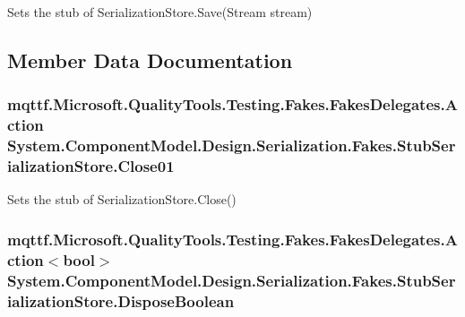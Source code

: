Sets the stub of Serialization\-Store.\-Save(\-Stream stream)



\subsection{Member Data Documentation}
\hypertarget{class_system_1_1_component_model_1_1_design_1_1_serialization_1_1_fakes_1_1_stub_serialization_store_adc5a8f6eb43aa016bbcc0d95c9507b6c}{
\subsubsection[{Close01}]{\setlength{\rightskip}{0pt plus 5cm}mqttf.\-Microsoft.\-Quality\-Tools.\-Testing.\-Fakes.\-Fakes\-Delegates.\-Action System.\-Component\-Model.\-Design.\-Serialization.\-Fakes.\-Stub\-Serialization\-Store.\-Close01}}\label{class_system_1_1_component_model_1_1_design_1_1_serialization_1_1_fakes_1_1_stub_serialization_store_adc5a8f6eb43aa016bbcc0d95c9507b6c}


Sets the stub of Serialization\-Store.\-Close()

\hypertarget{class_system_1_1_component_model_1_1_design_1_1_serialization_1_1_fakes_1_1_stub_serialization_store_a0912d62a0f0e8721c612be201391eda4}{
\subsubsection[{Dispose\-Boolean}]{\setlength{\rightskip}{0pt plus 5cm}mqttf.\-Microsoft.\-Quality\-Tools.\-Testing.\-Fakes.\-Fakes\-Delegates.\-Action$<$bool$>$ System.\-Component\-Model.\-Design.\-Serialization.\-Fakes.\-Stub\-Serialization\-Store.\-Dispose\-Boolean}}\label{class_system_1_1_component_model_1_1_design_1_1_serialization_1_1_fakes_1_1_stub_serialization_store_a0912d62a0f0e8721c612be201391eda4}


